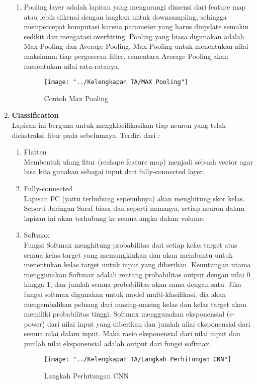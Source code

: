 \documentclass[a4paper]{article}
\begin{document}
\begin{enumerate}
\begin{enumerate}
					\item Pooling layer adalah lapisan yang mengurangi dimensi dari feature map atau lebih dikenal dengan langkan untuk downsampling, sehingga mempercepat komputasi karena parameter yang harus diupdate semakin sedikit dan mengatasi overfitting. Pooling yang biasa digunakan adalah Max Pooling dan Average Pooling. Max Pooling untuk menentukan nilai maksimum tiap pergeseran filter, sementara Average Pooling akan menentukan nilai rata-ratanya.
					
					\begin{figure}[h]
						\centering
						\texttt{[image: "../Kelengkapan TA/MAX Pooling"]}
						\caption[Max Pooling]{Contoh Max Pooling}
						\label{fig:max-pooling}
					\end{figure}
				
				\end{enumerate}
			
				\newpage
				\item \textbf{Classification} \\
				Lapisan ini berguna untuk mengklasifikasikan tiap neuron yang telah diekstraksi fitur pada sebelumnya. Terdiri dari :
				
				\begin{enumerate}
					\item Flatten\\
					Membentuk ulang fitur (reshape feature map) menjadi sebuah vector agar bisa kita gunakan sebagai input dari fully-connected layer.
					\item Fully-connected\\
					Lapisan FC (yaitu terhubung sepenuhnya) akan menghitung skor kelas. Seperti Jaringan Saraf biasa dan seperti namanya, setiap neuron dalam lapisan ini akan terhubung ke semua angka dalam volume.
					\item Softmax\\
					Fungsi Softmax menghitung probabilitas dari setiap kelas target atas semua kelas target yang memungkinkan dan akan membantu untuk menentukan kelas target untuk input yang diberikan. Keuntungan utama menggunakan Softmax adalah rentang probabilitas output dengan nilai 0 hingga 1, dan jumlah semua probabilitas akan sama dengan satu. Jika fungsi softmax digunakan untuk model multi-klasifikasi, dia akan mengembalikan peluang dari masing-masing kelas dan kelas target akan memiliki probabilitas tinggi. Softmax menggunakan eksponensial (e-power) dari nilai input yang diberikan dan jumlah nilai eksponensial dari semua nilai dalam input. Maka rasio eksponensial dari nilai input dan jumlah nilai eksponensial adalah output dari fungsi softmax.
					\begin{figure}[h]
						\centering
						\texttt{[image: "../Kelengkapan TA/Langkah Perhitungan CNN"]}
						\caption[Calculation by Weight]{Langkah Perhitungan CNN}
						\label{fig:langkah-perhitungan-cnn}
					\end{figure}
				

\end{enumerate}
\end{enumerate}
\end{document}
